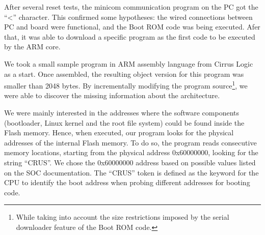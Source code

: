 \documentclass[conference]{IEEEtran}
\newcommand{\revisar}[1]{}
\newcommand{\nota}[1]{}
\begin{document}
After several reset tests, the minicom communication program on the PC got the ``\textless'' character. This confirmed some hypotheses: the wired connections between PC and board were functional, and the Boot ROM code was being executed. Afer that, it was able to download a specific program as the first code to be executed by the ARM core.


\nota{Posteriormente, preparamos un pequeño programa en lenguaje ensamblador que no supere
los 2048 bytes, y que nos permita ejecutar instrucciones en la CPU del 
ENTC-1000. Tomamos como base un ejemplo publicado por Cirrus, y lo modificamos
para realizar las pruebas con respecto a la información que
nos faltaba por conocer.}

We took a small sample program in ARM assembly language from Cirrus Logic as a start. Once assembled, the resulting object version for this program was smaller than 2048 bytes. By incrementally modifying the program source\footnote{While taking into account the size restrictions imposed by the serial downloader feature of the Boot ROM code.}, we were able to discover the missing information about the architecture. \revisar{, and
it fits the size restrictions imposed by the the serial downloader feature
of the Boot ROM code.} 

\nota{En particular, hicimos que nuestro pequeño programa encontrara
la dirección física de la memoria Flash interna.
El interés por encontrar esta dirección
base, es porque en esta memoria residen los componentes de software: 
gestor de arranque, el kernel Linux, y el sistemas de archivos raíz.}

We were mainly interested in the addresses where the software components
(bootloader, Linux kernel and the root file system) could be found inside the
Flash memory. Hence, when executed, our program looks for the physical 
addresses of the internal Flash memory. To do so, the program reads consecutive
memory locations, starting from the physical address  0x60000000, looking for the string ``CRUS''.
We chose the 0x60000000 address based on possible values listed on the SOC documentation.
The ``CRUS'' token is defined as the keyword for the CPU to identify 
the boot address when probing different addresses for booting code.


\nota{Para lograr el cometido, enviamos nuestro programa en los 2048 bytes
que el sistema lee desde el arranque vía ``download en serie''.
Nuestro programa leyó bytes
de direcciones consecutivas, comenzando en la dirección 0x60000000 (que
tomamos como referencia del manual de Cirrus).
Encontramos la dirección base de la memoria Flash en 
la dirección 0x60001000, ya que el programa leyó la palabra ``CRUS''
en cuatro bytes consecutivos. Esos cuatro bytes ``CRUS'' indican el inicio
del software de arranque, ya que está especificado en el manual
de la programación del SOC.}
\end{document}
